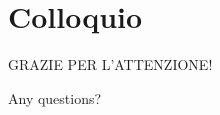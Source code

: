 \documentclass[italian]{beamer}
\begin{document}
\part[Colloquio]{Colloquio}

\begin{frame}[plain]
	
	\vfill
	
	\begin{center}
		{\Large GRAZIE PER L'ATTENZIONE!}
		
		\bigskip
		
		\begin{center}\Huge{Any questions?}\end{center}

	\end{center}
	
	\vfill
	
\end{frame}
\end{document}
